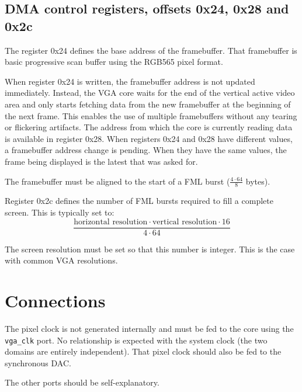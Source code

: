 \documentclass[a4paper,11pt]{article}
\begin{document}
\subsection{DMA control registers, offsets 0x24, 0x28 and 0x2c}
The register 0x24 defines the base address of the framebuffer. That framebuffer is basic progressive scan buffer using the RGB565 pixel format.

When register 0x24 is written, the framebuffer address is not updated immediately. Instead, the VGA core waits for the end of the vertical active video area and only starts fetching data from the new framebuffer at the beginning of the next frame. This enables the use of multiple framebuffers without any tearing or flickering artifacts. The address from which the core is currently reading data is available in register 0x28.
When registers 0x24 and 0x28 have different values, a framebuffer address change is pending. When they have the same values, the frame being displayed is the latest that was asked for.

The framebuffer must be aligned to the start of a FML burst ($\frac{4 \cdot 64}{8}$ bytes).

Register 0x2c defines the number of FML bursts required to fill a complete screen. This is typically set to:
\[
\frac{\text{horizontal resolution} \cdot \text{vertical resolution} \cdot 16}{4 \cdot 64}
\]

The screen resolution must be set so that this number is integer. This is the case with common VGA resolutions.

\section{Connections}
The pixel clock is not generated internally and must be fed to the core using the \verb!vga_clk! port. No relationship is expected with the system clock (the two domains are entirely independent). That pixel clock should also be fed to the synchronous DAC.

The other ports should be self-explanatory.
\end{document}

